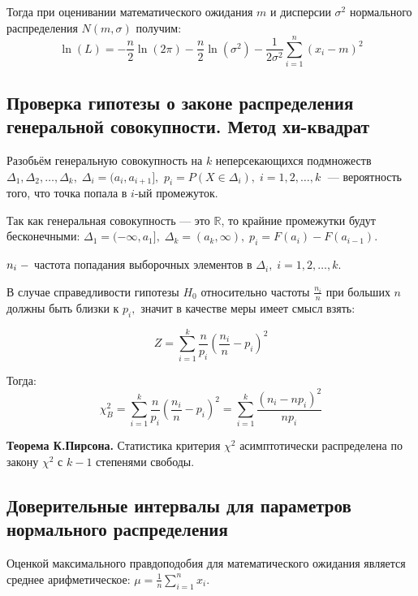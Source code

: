 \documentclass[12pt,a4paper]{article}
\begin{document}
		Тогда при оценивании математического ожидания $m$ и дисперсии $\sigma^2$ нормального распределения $N(m,\sigma)$ получим:
		\begin{equation}
		\ln(L)=-\frac{n}{2}\ln(2\pi)-\frac{n}{2}\ln\left(\sigma^2\right)-\frac{1}{2\sigma^2}\sum\limits_{i=1}^n(x_i-m)^2
		\end{equation}
	
	\subsection{Проверка гипотезы о законе распределения генеральной совокупности. Метод хи-квадрат}
		Разобьём генеральную совокупность на $k$ неперсекающихся подмножеств $\Delta_1, \Delta_2,\ldots, \Delta_k,\;\Delta_i = (a_i,a_{i+1}],$ $p_i = P(X\in\Delta_i),\;i=1,2,\ldots,k\;$ --- вероятность того, что точка попала в $i$-ый промежуток.
		
		Так как генеральная совокупность --- это $\mathbb{R}$, то крайние промежутки будут бесконечными: $\Delta_1 = (-\infty,a_1], \;\Delta_k = (a_k,\infty), \;p_i = F(a_i) - F(a_{i-1})$.
		
		$n_i\;\--$ частота попадания выборочных элементов в $\Delta_i,\;i=1,2,\ldots,k.$
		
		В случае справедливости гипотезы $H_0$ относительно частоты $\frac{n_i}{n}$ при больших $n$ должны быть близки к $p_i,$ значит в качестве меры имеет смысл взять: 
		
		\begin{equation}
		Z = \sum\limits_{i=1}^k\frac{n}{p_i}\left(\frac{n_i}{n}-p_i\right)^2
		\end{equation}
	
		Тогда:
		\begin{equation}
		\chi^2_B=\sum\limits_{i=1}^k\frac{n}{p_i}\left(\frac{n_i}{n}-p_i\right)^2=\sum\limits_{i=1}^k\frac{(n_i-np_i)^2}{np_i}
		\end{equation}
		
		\textbf{Теорема К.Пирсона.} Статистика критерия $\chi^2$ асимптотически распределена по закону $\chi^2$ с $k - 1$ степенями свободы.
		
	\subsection{Доверительные интервалы для параметров нормального распределения}
		Оценкой максимального правдоподобия для математического ожидания  является среднее арифметическое: $\mu=\frac{1}{n}\sum\limits_{i=1}^nx_i.$
		
\end{document}
